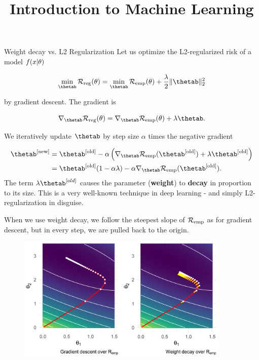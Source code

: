 



\newcommand{\titlefigure}{figure_man/L2-regularization01.png}
\newcommand{\learninggoals}{
  \item Have a geometric understanding of L2-regularization
  \item Understand why L2-regularization in combination with gradient descent is called weight decay
}

\title{Introduction to Machine Learning}
\date{}






\begin{vbframe}{Weight decay vs. L2 Regularization}
Let us optimize the L2-regularized risk of a model $f(x | \theta)$

\[
\min_{\thetab} \riskrt = \min_{\thetab} \risket + \frac{\lambda}{2} \|\thetab\|^2_2
\]

by gradient descent. The gradient is

\[
\nabla_{\thetab} \riskrt = \nabla_{\thetab} \risket + \lambda \thetab.
\]

We iteratively update $\thetab$ by step size \(\alpha\) times the
negative gradient

\begin{align*}
\thetab^{[\text{new}]} &= \thetab^{[\text{old}]} - \alpha \left(\nabla_{\thetab} \riske(\thetab^{[\text{old}]}) + \lambda \thetab^{[\text{old}]}\right) \\&=
\thetab^{[\text{old}]} (1 - \alpha \lambda) - \alpha \nabla_{\thetab} \riske(\thetab^{[\text{old}]}).
\end{align*}
The term \(\lambda \thetab^{[old]}\) causes the parameter
(\textbf{weight}) to \textbf{decay} in proportion to its size. This is a very well-known technique in deep learning - and simply L2-regularization in disguise.

\framebreak

When we use weight decay, we follow the steepest slope of $\mathcal{R}_{\text{emp}}$ as for gradient descent, but in every step, we are pulled back to the origin.

\begin{figure}
\includegraphics[width=0.9\textwidth]{figure_man/L2-regularization01.png}\\
\end{figure}



\end{vbframe}
